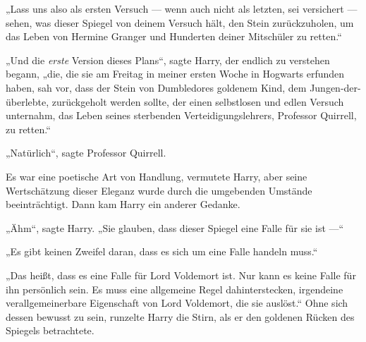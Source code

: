 „Lass uns also als ersten Versuch — wenn auch nicht als letzten, sei versichert — sehen, was dieser Spiegel von deinem Versuch hält, den Stein zurückzuholen, um das Leben von Hermine Granger und Hunderten deiner Mitschüler zu retten.“

„Und die \emph{erste} Version dieses Plans“, sagte Harry, der endlich zu verstehen begann, „die, die sie am Freitag in meiner ersten Woche in Hogwarts erfunden haben, sah vor, dass der Stein von Dumbledores goldenem Kind, dem Jungen-der-überlebte, zurückgeholt werden sollte, der einen selbstlosen und edlen Versuch unternahm, das Leben seines sterbenden Verteidigungslehrers, Professor Quirrell, zu retten.“

„Natürlich“, sagte Professor Quirrell.

Es war eine poetische Art von Handlung, vermutete Harry, aber seine Wertschätzung dieser Eleganz wurde durch die umgebenden Umstände beeinträchtigt.
Dann kam Harry ein anderer Gedanke.

„Ähm“, sagte Harry.
„Sie glauben, dass dieser Spiegel eine Falle für sie ist —“

„Es gibt keinen Zweifel daran, dass es sich um eine Falle handeln muss.“

„Das heißt, dass es eine Falle für Lord Voldemort ist. Nur kann es keine Falle für ihn persönlich sein. Es muss eine allgemeine Regel dahinterstecken, irgendeine verallgemeinerbare Eigenschaft von Lord Voldemort, die sie auslöst.“
Ohne sich dessen bewusst zu sein, runzelte Harry die Stirn, als er den goldenen Rücken des Spiegels betrachtete.

